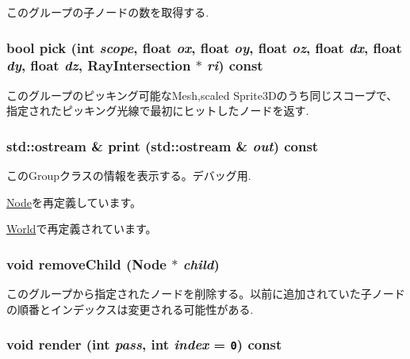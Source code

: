 このグループの子ノードの数を取得する. \hypertarget{classm3g_1_1Group_10a3c77fa36fdb5d09b2bf39fe2a7c0b}{
\subsubsection[{pick}]{\setlength{\rightskip}{0pt plus 5cm}bool pick (int {\em scope}, \/  float {\em ox}, \/  float {\em oy}, \/  float {\em oz}, \/  float {\em dx}, \/  float {\em dy}, \/  float {\em dz}, \/  {\bf RayIntersection} $\ast$ {\em ri}) const}}
\label{classm3g_1_1Group_10a3c77fa36fdb5d09b2bf39fe2a7c0b}


このグループのピッキング可能なMesh,scaled Sprite3Dのうち同じスコープで、指定されたピッキング光線で最初にヒットしたノードを返す. \hypertarget{classm3g_1_1Group_6fea17fa1532df3794f8cb39cb4f911f}{
\subsubsection[{print}]{\setlength{\rightskip}{0pt plus 5cm}std::ostream \& print (std::ostream \& {\em out}) const}}
\label{classm3g_1_1Group_6fea17fa1532df3794f8cb39cb4f911f}


このGroupクラスの情報を表示する。デバッグ用. 

\hyperlink{classm3g_1_1Node_6fea17fa1532df3794f8cb39cb4f911f}{Node}を再定義しています。

\hyperlink{classm3g_1_1World_6fea17fa1532df3794f8cb39cb4f911f}{World}で再定義されています。\hypertarget{classm3g_1_1Group_7415646c6f397f080d198176df44395c}{
\subsubsection[{removeChild}]{\setlength{\rightskip}{0pt plus 5cm}void removeChild ({\bf Node} $\ast$ {\em child})}}
\label{classm3g_1_1Group_7415646c6f397f080d198176df44395c}


このグループから指定されたノードを削除する。以前に追加されていた子ノードの順番とインデックスは変更される可能性がある. \hypertarget{classm3g_1_1Group_1efcb1973989d9963d5bd6d03065d389}{
\subsubsection[{render}]{\setlength{\rightskip}{0pt plus 5cm}void render (int {\em pass}, \/  int {\em index} = {\tt 0}) const}}
\label{classm3g_1_1Group_1efcb1973989d9963d5bd6d03065d389}


